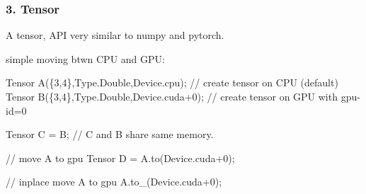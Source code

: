 \subsubsection*{3. Tensor}


\begin{DoxyItemize}
\item A tensor, A\+PI very similar to numpy and pytorch.
\item simple moving btwn C\+PU and G\+PU\+:
\end{DoxyItemize}


\begin{DoxyCode}
Tensor A(\{3,4\},Type.Double,Device.cpu); \textcolor{comment}{// create tensor on CPU (default)}
Tensor B(\{3,4\},Type.Double,Device.cuda+0); \textcolor{comment}{// create tensor on GPU with gpu-id=0}


Tensor C = B; \textcolor{comment}{// C and B share same memory.}

\textcolor{comment}{// move A to gpu}
Tensor D = A.to(Device.cuda+0);

\textcolor{comment}{// inplace move A to gpu}
A.to\_(Device.cuda+0);
\end{DoxyCode}

